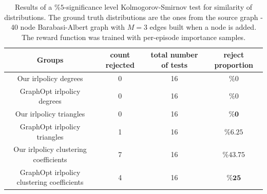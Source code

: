 \documentclass{report}
\numberwithin{equation}{section}
\numberwithin{figure}{section}
\numberwithin{table}{section}
\numberwithin{algorithm}{section}
\begin{document}
\begin{table}[!h]
  \begin{center}
    \caption{\label{tab:KS5pVanilla2} 
    Results of a $\%5$-significance level 
    Kolmogorov-Smirnov 
    test for similarity of distributions. 
    The ground truth distributions are the ones 
    from the source graph - 40 node Barabasi-Albert graph 
    with $M=3$ edges built when a node is added. The reward 
    function was trained with per-episode importance samples.}
    \begin{tabular}{|c|c|c|c|}
      \hline
      \textbf{Groups} & \textbf{count rejected} & \textbf{total number of tests} & \textbf{reject proportion}\\
      \hline
      Our irlpolicy degrees & 0 & 16 & $\%0$\\
      GraphOpt irlpolicy degrees & 0 & 16 & $\%0$\\
      \hline
      Our irlpolicy triangles & 0 & 16 & $\%\textbf{0}$\\
      GraphOpt irlpolicy triangles & 1 & 16 & $\%6.25$\\
      \hline
      Our irlpolicy clustering coefficients & 7 & 16 & $\%43.75$\\
      GraphOpt irlpolicy clustering coefficients & 4 & 16 & $\%\textbf{25}$\\
      \hline
    \end{tabular}
  \end{center}
\end{table}

\end{document}
